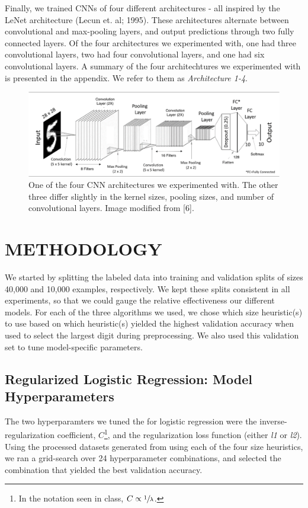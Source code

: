 \documentclass[letterpaper, 10 pt, conference]{ieeeconf}  %
\begin{document}
Finally, we trained CNNs of four different architectures - all inspired by the LeNet architecture (Lecun et. al; 1995). These architectures alternate between convolutional and max-pooling layers, and output predictions through two fully connected layers. Of the four architectures we experimented with, one had three convolutional layers, two had four convolutional layers, and one had six convolutional layers. A summary of the four architechtures we experimented with is presented in the appendix. We refer to them as \emph{Architecture 1-4}. 
\begin{figure}[H]
      \centering
      \includegraphics[scale = .42]{conv4_arch}
		\centering
      \caption{One of the four CNN architectures we experimented with. The other three differ slightly in the kernel sizes, pooling sizes, and number of convolutional layers. Image modified from [6].}
      \label{figurelabel}
\end{figure}

\section{METHODOLOGY}

We started by splitting the labeled data into training and validation splits of sizes 40,000 and 10,000 examples, respectively. We kept these splits consistent in all experiments, so that we could gauge the relative effectiveness our different models. For each of the three algorithms we used, we chose which size heuristic(s) to use based on which heuristic(s) yielded the highest validation accuracy when used to select the largest digit during preprocessing. We also used this validation set to tune model-specific parameters.

\subsection{Regularized Logistic Regression: Model Hyperparameters} 

The two hyperparamters we tuned the for logistic regression were the inverse-regularization coefficient, $C$\footnote{In the notation seen in class, $C \propto \sfrac{1}{\lambda}$.}, and the regularization loss function (either \emph{l1} or \emph{l2}). Using the processed datasets generated from using each of the four size heuristics, we ran a grid-search over 24 hyperparameter combinations, and selected the combination that yielded the best validation accuracy.   
\end{document}
